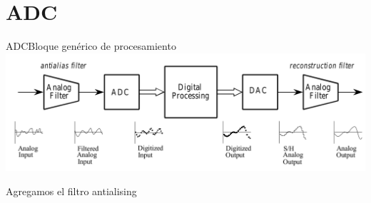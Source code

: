  \section{ADC}
 \begin{frame}{ADC}{Bloque genérico de procesamiento}
    \center\includegraphics[width=1\textwidth]{1_clase/adc_dac2}
    \begin{alertblock} {Agregamos el filtro antialising}
    \end{alertblock}
    \vfill
 \end{frame}
